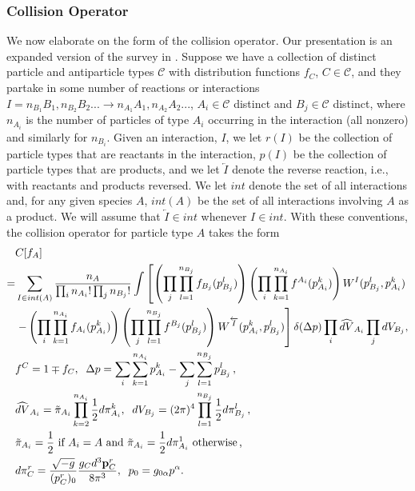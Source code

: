 \subsubsection{Collision Operator}
We now elaborate on the form of the collision operator.  Our presentation is an expanded version of the survey in \cite{ehlers}.  Suppose we have a collection of  distinct particle and antiparticle types $\mathcal{C}$ with distribution functions $f_{C}$, $C\in\mathcal{C}$, and they partake in some number of reactions or interactions $I=n_{B_1} B_1, n_{B_2}B_2...\longrightarrow n_{A_1} A_1,n_{A_2}A_2...$, $A_i\in\mathcal{C}$ distinct and $B_j\in\mathcal{C}$ distinct, where $n_{A_i}$ is the number of particles of type $A_i$ occurring in the interaction (all nonzero) and similarly for $n_{B_i}$.  Given an interaction, $I$, we let $r(I)$ be the collection of particle types that are reactants in the interaction, $p(I)$ be the collection of particle types that are products, and we let $\overleftarrow{I}$ denote the reverse reaction, i.e., with reactants and products reversed.   We let $int$ denote the set of all interactions and, for any given species $A$, $int(A)$ be the set of all interactions involving $A$ as a   product.   We will assume that $\overleftarrow{I}\in int$ whenever $I\in int$.  With these conventions, the collision operator for particle type $A$ takes the form
\begin{align}\label{collision_operator}
&C[f_A]\\
=&\sum_{I\in int(A)} \frac{n_A}{\prod_i n_{A_i}!\prod _j n_{B_j}!}\int\left[\left(\prod_j \prod_{l=1}^{n_{B_j}}f_{B_j}(p_{B_j}^l)\right)\left(\prod_i \prod_{k=1}^{n_{A_i}}f^{A_i}(p_{A_i}^k)\right)W^I(p_{B_j}^l,p_{A_i}^k) \right.\notag\\
& \left. -\left(\prod_i \prod_{k=1}^{n_{A_i}}f_{A_i}(p_{A_i}^k)\right)\left(\prod_j \prod_{l=1}^{n_{B_j}}f^{B_j}(p_{B_j}^l)\right)W^{\overleftarrow{I}}(p_{A_i}^k,p_{B_j}^l) \right] \delta(\Delta p)\prod_i \widehat{dV}_{A_i}\prod_j dV_{B_j},\notag\\
&f^C=1\mp f_C, \hspace{2mm} \Delta p=\sum_i \sum_{k=1}^{n_{A_i}}p^k_{A_i}-\sum_j \sum_{l=1}^{n_{B_j}}p^l_{B_j}\,,\notag\\
&\widehat{dV}_{A_i}=\tilde{\pi}_{A_i}\prod_{k=2}^{n_{A_i}}\frac{1}{2}d\pi^k_{A_i}, \hspace{2mm}  dV_{B_j}=(2\pi)^4\prod_{l=1}^{n_{B_j}}\frac{1}{2}d\pi^l_{B_j}\,,\notag\\
&\tilde{\pi}_{A_i}=\frac{1}{2} \text{ if } A_i=A \text{ and }  \tilde{\pi}_{A_i}=\frac{1}{2}d\pi^1_{A_i} \text{ otherwise\,,} \notag\\
&d\pi_{C}^r=\frac{\sqrt{-g}}{(p_{C}^r)_0}\frac{g_{C}d^3{\bf p}_{C}^r}{8\pi^3}, \hspace{2mm}p_0=g_{0\alpha}p^\alpha.\notag
\end{align}
